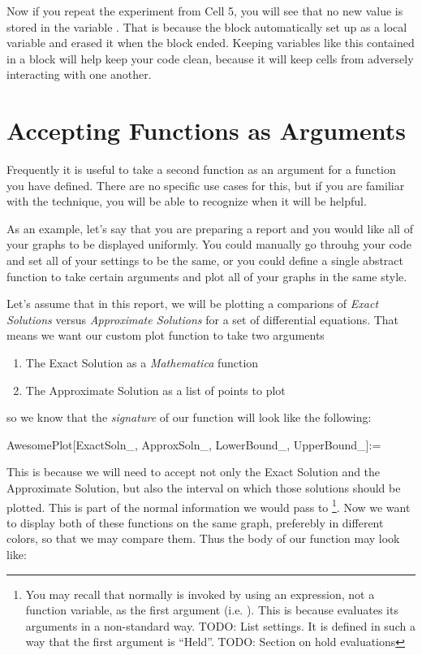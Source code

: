 Now if you repeat the experiment from Cell 5, you will see that no new value is stored in the variable . That is because the block automatically set  up as a local variable and erased it when the block ended. Keeping variables like this contained in a block will help keep your code clean, because it will keep cells from adversely interacting with one another. 

\section{Accepting Functions as Arguments}

Frequently it is useful to take a second function as an argument for a function you have defined. There are no specific use cases for this, but if you are familiar with the technique, you will be able to recognize when it will be helpful.

As an example, let's say that you are preparing a report and you would like all of your graphs to be displayed uniformly. You could manually go throuhg your code and set all of your  settings to be the same, or you could define a single abstract function to take certain arguments and plot all of your graphs in the same style.

Let's assume that in this report, we will be plotting a comparions of \emph{Exact Solutions} versus \emph{Approximate Solutions} for a set of differential equations. That means we want our custom plot function to take two arguments
\begin{enumerate}
	   \item The Exact Solution as a \emph{Mathematica} function
	   \item The Approximate Solution as a list of points to plot
\end{enumerate}
so we know that the \emph{signature} of our function will look like the following:
\begin{code}
	   AwesomePlot[ExactSoln\_, ApproxSoln\_, LowerBound\_, UpperBound\_]:=
\end{code}

This is because we will need to accept not only the Exact Solution and the Approximate Solution, but also the interval on which those solutions should be plotted. This is part of the normal information we would pass to \footnote{You may recall that normally  is invoked by using an expression, not a function variable, as the first argument (i.e. ). This is because  evaluates its arguments in a non-standard way. TODO: List settings. It is defined in such a way that the first argument is ``Held''. TODO: Section on hold evaluations}. Now we want to display both of these functions on the same graph, preferebly in different colors, so that we may compare them. Thus the body of our function may look like:


